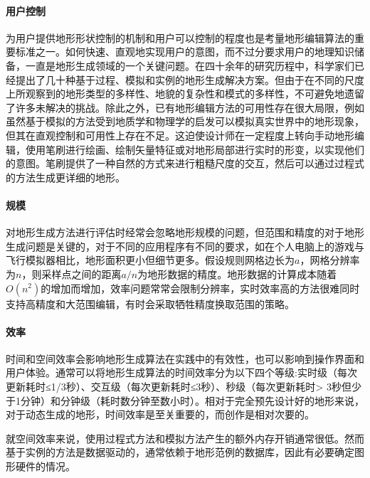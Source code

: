 \paragraph{用户控制}
为用户提供地形形状控制的机制和用户可以控制的程度也是考量地形编辑算法的重要标准之一。如何快速、直观地实现用户的意图，而不过分要求用户的地理知识储备，一直是地形生成领域的一个关键问题。在四十余年的研究历程中，科学家们已经提出了几十种基于过程、模拟和实例的地形生成解决方案。但由于在不同的尺度上所观察到的地形类型的多样性、地貌的复杂性和模式的多样性，不可避免地遗留了许多未解决的挑战。除此之外，已有地形编辑方法的可用性存在很大局限，例如虽然基于模拟的方法受到地质学和物理学的启发可以模拟真实世界中的地形现象，但其在直观控制和可用性上存在不足。这迫使设计师在一定程度上转向手动地形编辑，使用笔刷进行绘画、绘制矢量特征或对地形局部进行实时的形变，以实现他们的意图。笔刷提供了一种自然的方式来进行粗糙尺度的交互，然后可以通过过程式的方法生成更详细的地形。
\paragraph{规模} 
对地形生成方法进行评估时经常会忽略地形规模的问题，但范围和精度的对于地形生成问题是关键的，对于不同的应用程序有不同的要求，如在个人电脑上的游戏与飞行模拟器相比，地形面积更小但细节更多。假设规则网格边长为$a$，网格分辨率为$n$，则采样点之间的距离$a/n$为地形数据的精度。地形数据的计算成本随着$O(n^2)$的增加而增加，效率问题常常会限制分辨率，实时效率高的方法很难同时支持高精度和大范围编辑，有时会采取牺牲精度换取范围的策略。
\paragraph{效率}
时间和空间效率会影响地形生成算法在实践中的有效性，也可以影响到操作界面和用户体验。通常可以将地形生成算法的时间效率分为以下四个等级:实时级（每次更新耗时≤1/3秒）、交互级（每次更新耗时≤3秒）、秒级（每次更新耗时> 3秒但少于1分钟）和分钟级（耗时数分钟至数小时）。相对于完全预先设计好的地形来说，对于动态生成的地形，时间效率是至关重要的，而创作是相对次要的。\par
就空间效率来说，使用过程式方法和模拟方法产生的额外内存开销通常很低。然而基于实例的方法是数据驱动的，通常依赖于地形范例的数据库，因此有必要确定图形硬件的情况。

